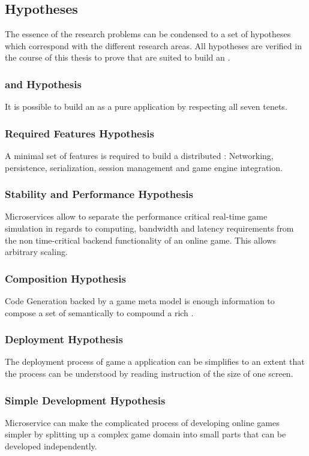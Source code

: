 \subsection{Hypotheses}
\label{sub:hypothesis}

The essence of the research problems can be condensed to a set of hypotheses
which correspond with the different research areas. All hypotheses are
verified in the course of this thesis to prove that \mss{} are suited to
build an \og{}. 

\subsubsection{\ogs{} and \mss{} Hypothesis}
It is possible to build an \og{} as a pure \ms{} application by
respecting all seven \ms{} tenets.

\subsubsection{Required Features Hypothesis}
A minimal set of features is required to build a distributed \og{}: Networking,
persistence, serialization, session management and game engine integration.

\subsubsection{Stability and Performance Hypothesis} 
Microservices allow to separate the performance critical real-time game
simulation in regards to computing, bandwidth and latency requirements from the
non time-critical backend functionality of an online game. This allows arbitrary
scaling.

\subsubsection{Composition Hypothesis}
Code Generation backed by a game meta model is enough information to compose a
set of \mss{} semantically to compound a rich \og{}.

\subsubsection{Deployment Hypothesis}
The deployment process of game a \ms{} application can be simplifies to an
extent that the process can be understood by reading instruction of the size of
one screen.

\subsubsection{Simple Development Hypothesis} 
Microservice can make the complicated process of developing online games simpler
by splitting up a complex game domain into small parts that can be developed
independently.

